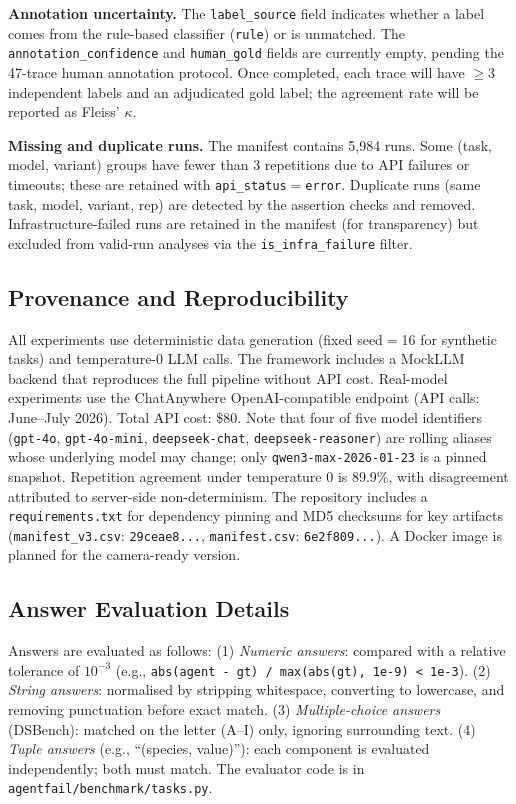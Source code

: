 \textbf{Annotation uncertainty.} The \texttt{label\_source} field indicates whether a label comes from the rule-based classifier (\texttt{rule}) or is unmatched. The \texttt{annotation\_confidence} and \texttt{human\_gold} fields are currently empty, pending the 47-trace human annotation protocol. Once completed, each trace will have $\geq 3$ independent labels and an adjudicated gold label; the agreement rate will be reported as Fleiss' $\kappa$.

\textbf{Missing and duplicate runs.} The manifest contains 5{,}984 runs. Some (task, model, variant) groups have fewer than 3 repetitions due to API failures or timeouts; these are retained with \texttt{api\_status}$=$\texttt{error}. Duplicate runs (same task, model, variant, rep) are detected by the assertion checks and removed. Infrastructure-failed runs are retained in the manifest (for transparency) but excluded from valid-run analyses via the \texttt{is\_infra\_failure} filter.

\subsection{Provenance and Reproducibility}

All experiments use deterministic data generation (fixed seed$=$16 for synthetic tasks) and temperature-0 LLM calls. The framework includes a MockLLM backend that reproduces the full pipeline without API cost. Real-model experiments use the ChatAnywhere OpenAI-compatible endpoint (API calls: June--July 2026). Total API cost: \$80. Note that four of five model identifiers (\texttt{gpt-4o}, \texttt{gpt-4o-mini}, \texttt{deepseek-chat}, \texttt{deepseek-reasoner}) are rolling aliases whose underlying model may change; only \texttt{qwen3-max-2026-01-23} is a pinned snapshot. Repetition agreement under temperature 0 is 89.9\%, with disagreement attributed to server-side non-determinism. The repository includes a \texttt{requirements.txt} for dependency pinning and MD5 checksums for key artifacts (\texttt{manifest\_v3.csv}: \texttt{29ceae8...}, \texttt{manifest.csv}: \texttt{6e2f809...}). A Docker image is planned for the camera-ready version.

\subsection{Answer Evaluation Details}

Answers are evaluated as follows: (1) \emph{Numeric answers}: compared with a relative tolerance of $10^{-3}$ (e.g., \texttt{abs(agent - gt) / max(abs(gt), 1e-9) < 1e-3}). (2) \emph{String answers}: normalised by stripping whitespace, converting to lowercase, and removing punctuation before exact match. (3) \emph{Multiple-choice answers} (DSBench): matched on the letter (A--I) only, ignoring surrounding text. (4) \emph{Tuple answers} (e.g., ``(species, value)''): each component is evaluated independently; both must match. The evaluator code is in \texttt{agentfail/benchmark/tasks.py}.

